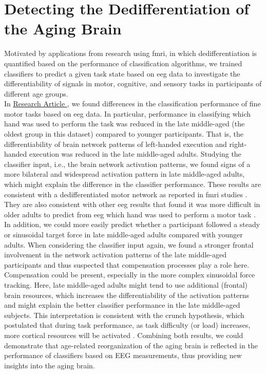 \section{Detecting the Dedifferentiation of the Aging Brain}
Motivated by applications from research using \gls{fmri}, in which dedifferentiation is quantified based on the performance of classification algorithms, we trained classifiers to predict a given task state based on \gls{eeg} data to investigate the differentiability of signals in motor, cognitive, and sensory tasks in participants of different age groups.\\
In \hyperref[results:paperI]{Research Article }, we found differences in the classification performance of fine motor tasks based on \gls{eeg} data. In particular, performance in classifying which hand was used to perform the task was reduced in the late middle-aged (the oldest group in this dataset) compared to younger participants. That is, the differentiability of brain network patterns of left-handed execution and right-handed execution was reduced in the late middle-aged adults. Studying the classifier input, i.e., the brain network activation patterns, we found signs of a more bilateral and widespread activation pattern in late middle-aged adults, which might explain the difference in the classifier performance. These results are consistent with a dedifferentiated motor network as reported in \gls{fmri} studies \cite{Carb2011, Cassedy2020}. They are also consistent with other \gls{eeg} results that found it was more difficult in older adults to predict from \gls{eeg} which hand was used to perform a motor task \cite{Chen2019, Zich2015}. In addition, we could more easily predict whether a participant followed a steady or sinusoidal target force in late middle-aged adults compared with younger adults. When considering the classifier input again, we found a stronger frontal involvement in the network activation patterns of the late middle-aged participants and thus suspected that compensation processes play a role here. Compensation could be present, especially in the more complex sinusoidal force tracking. Here, late middle-aged adults might tend to use additional (frontal) brain resources, which increases the differentiability of the activation patterns and might explain the better classifier performance in the late middle-aged subjects. This interpretation is consistent with the \gls{crunch} hypothesis, which postulated that during task performance, as task difficulty (or load) increases, more cortical resources will be activated \cite{Festini2018}. Combining both results, we could demonstrate that age-related reorganization of the aging brain is reflected in the performance of classifiers based on EEG measurements, thus providing new insights into the aging brain.\\

